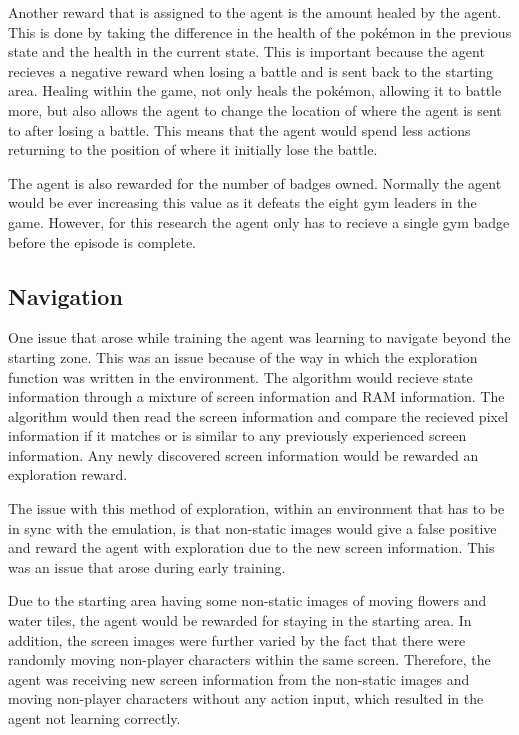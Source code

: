 Another reward that is assigned to the agent is the amount healed by the agent. This is done by taking the difference in the health of the pokémon in the previous state and the health in the current state. This is important because the agent recieves a negative reward when losing a battle and is sent back to the starting area. Healing within the game, not only heals the pokémon, allowing it to battle more, but also allows the agent to change the location of where the agent is sent to after losing a battle. This means that the agent would spend less actions returning to the position of where it initially lose the battle.

The agent is also rewarded for the number of badges owned. Normally the agent would be ever increasing this value as it defeats the eight gym leaders in the game. However, for this research the agent only has to recieve a single gym badge before the episode is complete.

\subsection{Navigation}

One issue that arose while training the agent was learning to navigate beyond the starting zone. This was an issue because of the way in which the exploration function was written in the environment. The algorithm would recieve state information through a mixture of screen information and RAM information. The algorithm would then read the screen information and compare the recieved pixel information if it matches or is similar to any previously experienced screen information. Any newly discovered screen information would be rewarded an exploration reward. 

The issue with this method of exploration, within an environment that has to be in sync with the emulation, is that non-static images would give a false positive and reward the agent with exploration due to the new screen information. This was an issue that arose during early training. 

Due to the starting area having some non-static images of moving flowers and water tiles, the agent would be rewarded for staying in the starting area. In addition, the screen images were further varied by the fact that there were randomly moving non-player characters within the same screen. Therefore, the agent was receiving new screen information from the non-static images and moving non-player characters without any action input, which resulted in the agent not learning correctly.

